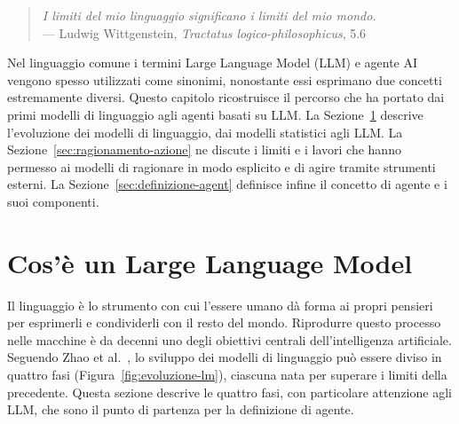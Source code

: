 \label{cap:llm-agent}


\begin{quote}
\textit{I limiti del mio linguaggio significano i limiti del mio mondo.} \\
\hfill --- Ludwig Wittgenstein, \textit{Tractatus logico-philosophicus}, 5.6
\end{quote}

Nel linguaggio comune i termini Large Language Model (LLM) e agente AI vengono spesso utilizzati come sinonimi, nonostante essi esprimano 
due concetti estremamente diversi. Questo capitolo ricostruisce il percorso che ha portato dai primi modelli di linguaggio agli agenti basati 
su LLM. La Sezione~\ref{sec:cos-e-un-llm} descrive l'evoluzione dei modelli di linguaggio, dai modelli statistici agli LLM. 
La Sezione~\ref{sec:ragionamento-azione} ne discute i limiti e i lavori che hanno permesso ai modelli di ragionare in modo esplicito e 
di agire tramite strumenti esterni. La Sezione~\ref{sec:definizione-agent} definisce infine il concetto di agente e i suoi componenti.

\section{Cos'è un Large Language Model}
\label{sec:cos-e-un-llm}

Il linguaggio è lo strumento con cui l'essere umano dà forma ai propri pensieri per esprimerli e condividerli con il resto del mondo. 
Riprodurre questo processo nelle macchine è da decenni uno degli obiettivi centrali dell'intelligenza artificiale. 
Seguendo Zhao et al.\ \cite{zhao2023survey}, lo sviluppo dei modelli di linguaggio può essere diviso in quattro fasi 
(Figura~\ref{fig:evoluzione-lm}), ciascuna nata per superare i limiti della precedente. Questa sezione descrive
le quattro fasi, con particolare attenzione agli LLM, che sono il punto di partenza per la definizione di agente.

